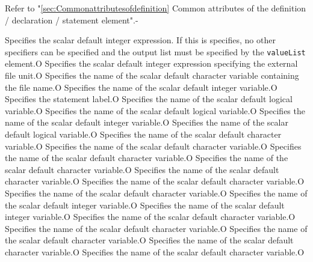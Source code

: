 \begin{XcodeMLAttributes}
{Refer to "\ref{sec:Commonattributesofdefinition} Common attributes of the definition / declaration / statement element".}{-}
\end{XcodeMLAttributes}

\begin{XcodeMLControlList}
{Specifies the scalar default integer expression. If this is specifies, no other specifiers
 can be specified and the output list must be specified by the {\tt valueList} element.}{O}
{Specifies the scalar default integer expression specifying the external file unit.}{O}
{Specifies the name of the scalar default character variable containing the file name.}{O}
{Specifies the name of the scalar default integer variable.}{O}
{Specifies the statement label.}{O}
{Specifies the name of the scalar default logical variable.}{O}
{Specifies the name of the scalar default logical variable.}{O}
{Specifies the name of the scalar default integer variable.}{O}
{Specifies the name of the scalar default logical variable.}{O}
{Specifies the name of the scalar default character variable.}{O}
{Specifies the name of the scalar default character variable.}{O}
{Specifies the name of the scalar default character variable.}{O}
{Specifies the name of the scalar default character variable.}{O}
{Specifies the name of the scalar default character variable.}{O}
{Specifies the name of the scalar default character variable.}{O}
{Specifies the name of the scalar default character variable.}{O}
{Specifies the name of the scalar default integer variable.}{O}
{Specifies the name of the scalar default integer variable.}{O}
{Specifies the name of the scalar default character variable.}{O}
{Specifies the name of the scalar default character variable.}{O}
{Specifies the name of the scalar default character variable.}{O}
{Specifies the name of the scalar default character variable.}{O}
{Specifies the name of the scalar default character variable.}{O}

\end{XcodeMLControlList}
